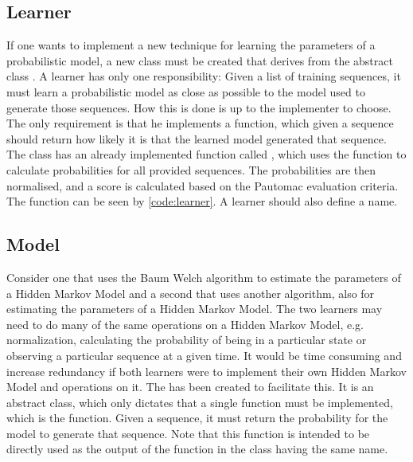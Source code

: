 \subsection{Learner}
If one wants to implement a new technique for learning the parameters of a probabilistic model, a new class must be created that derives from the abstract class .
A learner has only one responsibility: Given a list of training sequences, it must learn a probabilistic model as close as possible to the model used to generate those sequences. How this is done is up to the implementer to choose. The only requirement is that he implements a  function, which given a sequence should return how likely it is that the learned model generated that sequence.
The  class has an already implemented function called , which uses the  function to calculate probabilities for all provided sequences.
The probabilities are then normalised, and a score is calculated based on the Pautomac evaluation criteria.
The  function can be seen by \ref{code:learner}.
A learner should also define a name.

\subsection{Model}
Consider one  that uses the Baum Welch algorithm to estimate the parameters of a Hidden Markov Model and a second  that uses another algorithm, also for estimating the parameters of a Hidden Markov Model. The two learners may need to do many of the same operations on a Hidden Markov Model, e.g. normalization, calculating the probability of being in a particular state or observing a particular sequence at a given time. 
It would be time consuming and increase redundancy if both learners were to implement their own Hidden Markov Model and operations on it.
The  has been created to facilitate this. It is an abstract class, which only dictates that a single function must be implemented, which is the  function. Given a sequence, it must return the probability for the model to generate that sequence. Note that this function is intended to be directly used as the output of the function in the  class having the same name.

